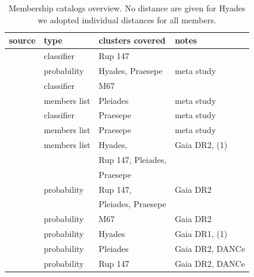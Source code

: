 \documentclass{aa}
\begin{document}
\begin{appendix}

\begin{table}
\caption{Membership catalogs overview. No distance are given for Hyades we adopted individual distances for all members. }
\label{table_app_memberships}
\centering
\begin{tabular}{llll}     %
\hline\hline
     source  & type  & clusters covered & notes\\
\hline
   \citet{curtis_ruprecht_2013} & classifier & Rup 147 & \\
   \citet{douglas_praesepe_hyades_2014} & probability & Hyades, Praesepe & meta study \\
   \citet{gonzalez_m67mem_2016} & classifier & M67 & \\
   \citet{rebull_rotation_2016} & members list & Pleiades & meta study\\
   \citet{rebull_praesepe_2017} & classifier & Praesepe & meta study\\
   \citet{douglas_poking_2017} & members list & Praesepe & meta study\\
   \citet{gaia_dr2_2018_hrd} & members list & Hyades,   & Gaia DR2, (1)\\%
   &&Rup 147, Pleiades, &\\
   &&Praesepe&\\
   \citet{cantat_gaudin_2018} & probability & Rup 147, & Gaia DR2\\%
   && Pleiades, Praesepe&\\
   \citet{gao_m67mem_2018} & probability & M67 & Gaia DR2\\
   \citet{reino_hyades_2018} & probability & Hyades & Gaia DR1, (1)\\
   \citet{olivares_pleiades_2018} & probability & Pleiades & Gaia DR2, DANCe\\
   \citet{olivares_ngc6774_2019} & probability & Rup 147 & Gaia DR2, DANCe\\
\hline
\end{tabular}
\end{table}



\end{appendix}
\end{document}
